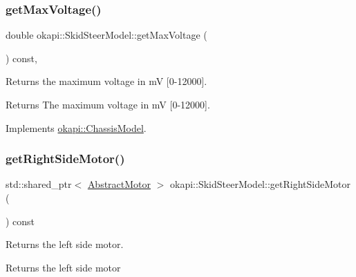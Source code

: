 \mbox{\label{classokapi_1_1SkidSteerModel_ad4849d18c3a244eb60e1056860a3c4cf}} 
\subsubsection{\texorpdfstring{getMaxVoltage()}{getMaxVoltage()}}
{\footnotesize\ttfamily double okapi\+::\+Skid\+Steer\+Model\+::get\+Max\+Voltage (\begin{DoxyParamCaption}{ }\end{DoxyParamCaption}) const\hspace{0.3cm}{\ttfamily [override]}, {\ttfamily [virtual]}}

Returns the maximum voltage in mV \mbox{[}0-\/12000\mbox{]}.

\begin{DoxyReturn}{Returns}
The maximum voltage in mV \mbox{[}0-\/12000\mbox{]}. 
\end{DoxyReturn}


Implements \mbox{\hyperlink{classokapi_1_1ChassisModel_a3ced2121524ae523592db64733c69472}{okapi\+::\+Chassis\+Model}}.

\mbox{\label{classokapi_1_1SkidSteerModel_a0c58a580708b864d8c4391c7045e590b}} 
\subsubsection{\texorpdfstring{getRightSideMotor()}{getRightSideMotor()}}
{\footnotesize\ttfamily std\+::shared\+\_\+ptr$<$ \mbox{\hyperlink{classokapi_1_1AbstractMotor}{Abstract\+Motor}} $>$ okapi\+::\+Skid\+Steer\+Model\+::get\+Right\+Side\+Motor (\begin{DoxyParamCaption}{ }\end{DoxyParamCaption}) const}

Returns the left side motor.

\begin{DoxyReturn}{Returns}
the left side motor 
\end{DoxyReturn}
\mbox{\label{classokapi_1_1SkidSteerModel_a850e4de7ab3a30a354ac39f30a1e8603}} 

